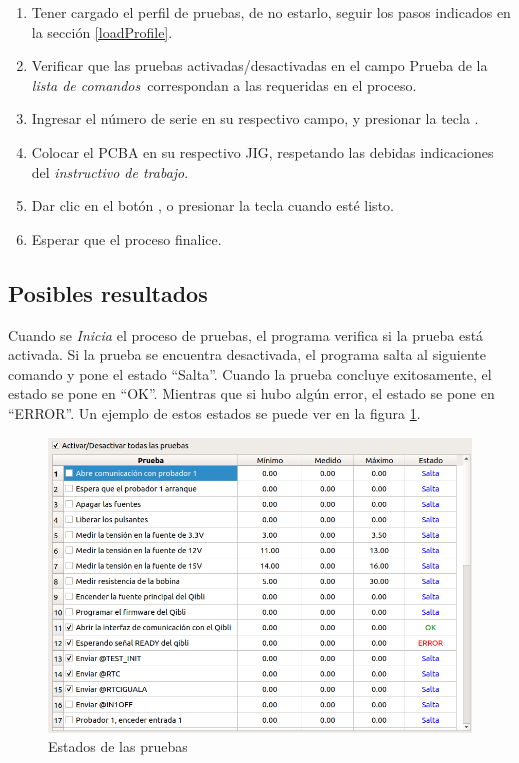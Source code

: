 \documentclass[a4paper,12pt]{refart}
\newcommand\commandList{\textit{lista de comandos}}
\begin{document}
\begin{enumerate}
\item Tener cargado el perfil de pruebas, de no estarlo, seguir los pasos indicados en la sección \ref{loadProfile}.
\item Verificar que las pruebas activadas/desactivadas en el campo Prueba de la \commandList\ correspondan a las requeridas en el proceso.
\item Ingresar el número de serie en su respectivo campo, y presionar la tecla \keys{\enter}.
\item Colocar el PCBA en su respectivo JIG, respetando las debidas indicaciones del \textit{instructivo de trabajo}.
\item Dar clic en el botón , o presionar la tecla \keys{\SPACE} cuando esté listo.
\item Esperar que el proceso finalice.
\end{enumerate}

\subsection{Posibles resultados}
Cuando se \textit{Inicia} el proceso de pruebas, el programa verifica si la prueba está activada. Si la prueba se encuentra desactivada, el programa salta al siguiente comando y pone el estado \textcolor[rgb]{0,0,1}{``Salta''}. Cuando la prueba concluye exitosamente, el estado se pone en \textcolor[rgb]{0,1,0}{``OK''}. Mientras que si hubo algún error, el estado se pone en \textcolor[rgb]{1,0,0}{``ERROR''}. Un ejemplo de estos estados se puede ver en la figura \ref{fig:runningTest1}.

\begin{figure}[hbt!]\centering
\includegraphics[width=\textwidth, frame]{images/running_test_error_1} 
\caption{Estados de las pruebas}
\label{fig:runningTest1}
\end{figure}
\end{document}
